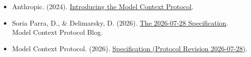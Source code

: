 \vspace{0.25em}
\begin{itemize}
\tightlist
\item
  Anthropic. (2024). \href{https://www.anthropic.com/news/model-context-protocol}{Introducing the Model Context Protocol}.
\item
  Soria Parra, D., \& Delimarsky, D. (2026). \href{https://blog.modelcontextprotocol.io/posts/2026-07-28/}{The 2026-07-28 Specification}. Model Context Protocol Blog.
\item
  Model Context Protocol. (2026). \href{https://modelcontextprotocol.io/specification/2026-07-28}{Specification (Protocol Revision 2026-07-28)}.
\end{itemize}

\clearpage
